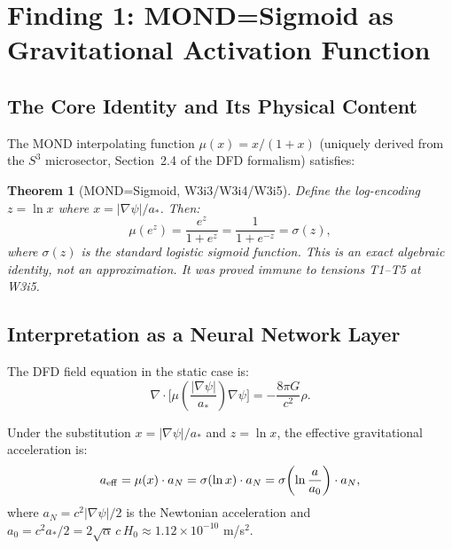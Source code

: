 \documentclass[11pt]{article}
\newtheorem{theorem}{Theorem}[section]
\theoremstyle{definition}
\theoremstyle{remark}
\newcommand{\ee}[1]{\times 10^{#1}}
\begin{document}
\section{Finding 1: MOND=Sigmoid as Gravitational Activation Function}
\label{sec:mond-sigmoid}

\subsection{The Core Identity and Its Physical Content}
\label{sec:identity}

The MOND interpolating function $\mu(x) = x/(1+x)$ (uniquely derived from
the $S^3$ microsector, Section~2.4 of the DFD formalism) satisfies:

\begin{theorem}[MOND=Sigmoid, W3i3/W3i4/W3i5]
\label{thm:mond-sigmoid}
Define the log-encoding $z = \ln x$ where $x = |\nabla\psi|/a_*$. Then:
\begin{equation}
  \mu(e^z) = \frac{e^z}{1 + e^z} = \frac{1}{1 + e^{-z}} = \sigma(z),
  \label{eq:mond-sigmoid}
\end{equation}
where $\sigma(z)$ is the standard logistic sigmoid function. This is an
exact algebraic identity, not an approximation. It was proved immune to
tensions T1--T5 at W3i5.
\end{theorem}

\subsection{Interpretation as a Neural Network Layer}
\label{sec:nn-interpretation}

The DFD field equation in the static case is:
\begin{equation}
  \nabla \cdot \bigl[\mu\!\left(\frac{|\nabla\psi|}{a_*}\right)
  \nabla\psi\bigr] = -\frac{8\pi G}{c^2}\rho.
  \label{eq:field-eq}
\end{equation}

Under the substitution $x = |\nabla\psi|/a_*$ and $z = \ln x$, the
effective gravitational acceleration is:
\begin{equation}
  a_{\rm eff} = \mu(x) \cdot a_N = \sigma(\ln x) \cdot a_N
  = \sigma\!\left(\ln\frac{a}{a_0}\right) \cdot a_N,
  \label{eq:aeff-sigmoid}
\end{equation}
where $a_N = c^2|\nabla\psi|/2$ is the Newtonian acceleration and
$a_0 = c^2 a_*/2 = 2\sqrt{\alpha}\,c\,H_0 \approx 1.12\ee{-10}$ m/s$^2$.
\end{document}

